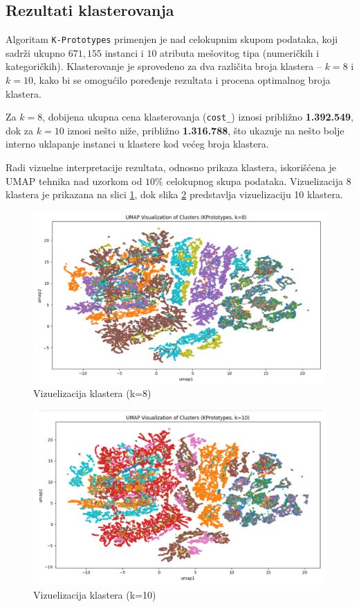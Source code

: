 \documentclass[a4paper,12pt]{article}
\begin{document}
\subsection{Rezultati klasterovanja}
Algoritam \texttt{K-Prototypes} primenjen je nad celokupnim skupom podataka, koji sadrži ukupno $671{,}155$ instanci i $10$ atributa mešovitog tipa (numeričkih i kategoričkih). Klasterovanje je sprovedeno za dva različita broja klastera -- $k=8$ i $k=10$, kako bi se omogućilo poređenje rezultata i procena optimalnog broja klastera.

Za $k=8$, dobijena ukupna cena klasterovanja (\texttt{cost\_}) iznosi približno \textbf{1.392.549}, dok za $k=10$ iznosi nešto niže, približno \textbf{1.316.788}, što ukazuje na nešto bolje interno uklapanje instanci u klastere kod većeg broja klastera.

Radi vizuelne interpretacije rezultata, odnosno prikaza klastera, iskorišćena je UMAP tehnika nad uzorkom od $10\%$ celokupnog skupa podataka. Vizuelizacija 8 klastera je prikazana na slici \ref{Slika:clusters1}, dok slika \ref{Slika:clusters2} predstavlja vizuelizaciju 10 klastera.

\begin{figure}[htbp]
    	\centering
    	\includegraphics[width=1\textwidth]{./images/umap_clusters1.png}
    	\caption{Vizuelizacija klastera (k=8)}
    	\label{Slika:clusters1}
\end{figure}
\begin{figure}[htbp]
    	\centering
    	\includegraphics[width=1\textwidth]{./images/umap_clusters2.png}
    	\caption{Vizuelizacija klastera (k=10)}
    	\label{Slika:clusters2}
\end{figure}
\end{document}
